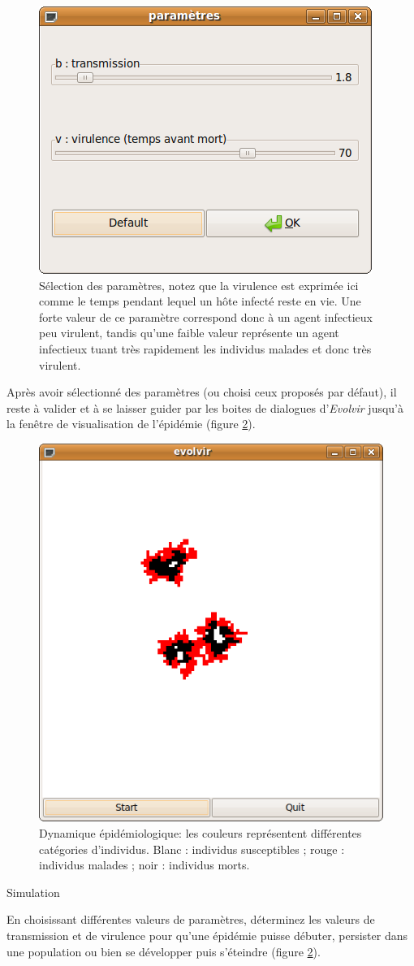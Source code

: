 \documentclass[12pt]{article}
\begin{document}
\begin{figure}[h!]
  \center
	\includegraphics[width=0.4\linewidth]{graph/parametres.png}
        \caption{Sélection des paramètres, notez que la virulence est
          exprimée ici comme le temps pendant lequel un hôte infecté
          reste en vie. Une forte valeur de ce paramètre correspond
          donc à un agent infectieux peu virulent, tandis qu'une
          faible valeur représente un agent infectieux tuant très
          rapidement les individus malades et donc très virulent.}
\label{fig:parametres}
\end{figure}

Après avoir sélectionné des paramètres (ou choisi ceux proposés par
défaut), il reste à valider et à se laisser guider par les boites de
dialogues d'\textit{Evolvir} jusqu'à la fenêtre de visualisation de
l'épidémie (figure \ref{fig:evolvir}).

\begin{figure}[h!]
  \center
	\includegraphics[width=0.4\linewidth]{graph/evolvir.png}
        \caption{Dynamique épidémiologique: les couleurs représentent
          différentes catégories d'individus. Blanc : individus
          susceptibles ; rouge : individus malades ; noir : individus
          morts.}
\label{fig:evolvir}
\end{figure}

                                                                                                                
\begin{bclogo}[couleur = gray!30, logo = \bclampe , barre =                                                      
none, noborder=true ]{Simulation}                                                                                  

En choisissant différentes valeurs de paramètres, déterminez les
valeurs de transmission et de virulence pour qu'une épidémie puisse
débuter, persister dans une population ou bien se développer puis
s'éteindre (figure \ref{fig:evolvir}).

\end{bclogo}                                                                                                        
\end{document}
